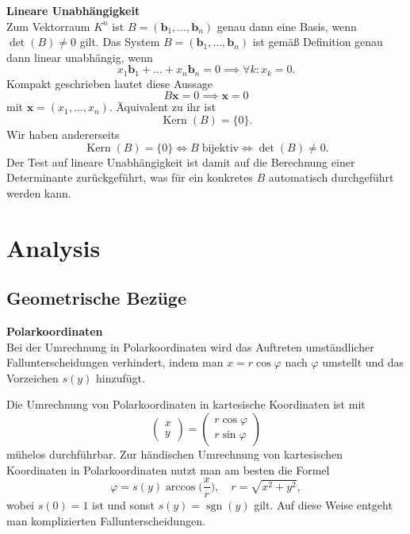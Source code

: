 \documentclass[paper=180mm:225mm,pagesize=auto,fleqn,twoside,11pt,dvipdfmx]{scrartcl}
\theoremstyle{rmbox}
\newenvironment{Rezept}[1]{\strong{#1}\\}{}
\newcommand{\strong}[1]{\textsf{\textbf{#1}}}
\newcommand{\bv}[1]{\mathbf{#1}}
\newcommand{\sgn}{\operatorname{sgn}}
\begin{document}
\begin{Rezept}{Lineare Unabhängigkeit}
Zum Vektorraum $K^n$ ist $B=(\bv b_1,\ldots,\bv b_n)$ genau dann eine
Basis, wenn $\det(B)\ne 0$ gilt.
\end{Rezept}
Das System $B=(\bv b_1,\ldots,\bv b_n)$ ist gemäß Definition genau
dann linear unabhängig, wenn
\[x_1 \bv b_1+\ldots + x_n\bv b_n = 0\implies \forall k\colon x_k = 0.\]
Kompakt geschrieben lautet diese Aussage
\[B\bv x = 0\implies \bv x=0\]
mit $\bv x = (x_1,\ldots,x_n)$. Äquivalent zu ihr ist
\[\operatorname{Kern}(B) = \{0\}.\]
Wir haben andererseits
\[\operatorname{Kern}(B) = \{0\}\iff B\;\text{bijektiv}\iff \det(B)\ne 0.\]
Der Test auf lineare Unabhängigkeit ist damit auf die Berechnung
einer Determinante zurückgeführt, was für ein konkretes $B$
automatisch durchgeführt werden kann.

\clearpage
\section{Analysis}

\subsection{Geometrische Bezüge}

\begin{Rezept}{Polarkoordinaten}
Bei der Umrechnung in Polarkoordinaten wird das Auftreten
umständlicher Fallunterscheidungen verhindert,
indem man $x=r\cos\varphi$ nach $\varphi$ umstellt
und das Vorzeichen $s(y)$ hinzufügt.
\end{Rezept}

\noindent
Die Umrechnung von Polarkoordinaten in kartesische Koordinaten
ist mit
\[\begin{pmatrix}x\\ y\end{pmatrix}
= \begin{pmatrix}r\cos\varphi\\ r\sin\varphi\end{pmatrix}\]
mühelos durchführbar. Zur händischen Umrechnung von kartesischen
Koordinaten in Polarkoordinaten nutzt man am besten die Formel
\[\varphi = s(y)\arccos\Big(\frac{x}{r}\Big),\quad r=\sqrt{x^2+y^2},\]
wobei $s(0)=1$ ist und sonst $s(y)=\sgn(y)$ gilt. Auf diese
Weise entgeht man komplizierten Fallunterscheidungen.
\end{document}
